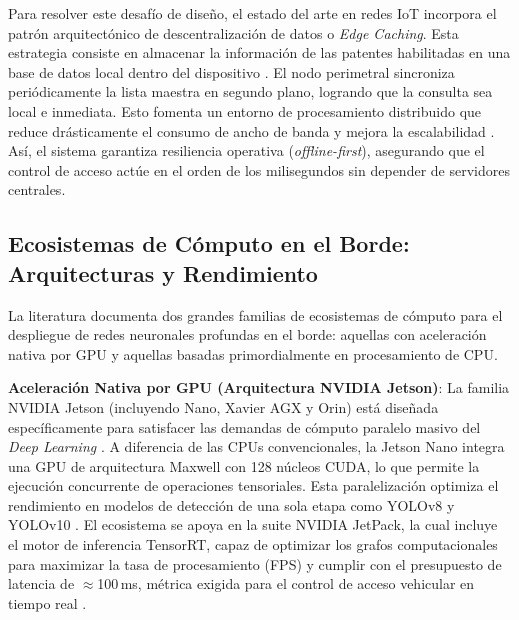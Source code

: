 Para resolver este desafío de diseño, el estado del arte en redes IoT incorpora el patrón arquitectónico de descentralización de datos o \textit{Edge Caching}. Esta estrategia consiste en almacenar la información de las patentes habilitadas en una base de datos local dentro del dispositivo \parencite{xuDeepLearningAlgorithms2026c}. El nodo perimetral sincroniza periódicamente la lista maestra en segundo plano, logrando que la consulta sea local e inmediata. Esto fomenta un entorno de procesamiento distribuido que reduce drásticamente el consumo de ancho de banda y mejora la escalabilidad \parencite{buleuDeepLearningBasedSystem2025a, kuyunsaDeepLearningEnhancedAutomatic2025}. Así, el sistema garantiza resiliencia operativa (\textit{offline-first}), asegurando que el control de acceso actúe en el orden de los milisegundos sin depender de servidores centrales.

\subsection{Ecosistemas de Cómputo en el Borde: Arquitecturas y Rendimiento}

La literatura documenta dos grandes familias de ecosistemas de cómputo para el despliegue 
de redes neuronales profundas en el borde: aquellas con aceleración nativa por GPU y 
aquellas basadas primordialmente en procesamiento de CPU.

\textbf{Aceleración Nativa por GPU (Arquitectura NVIDIA Jetson)}: 
La familia NVIDIA Jetson (incluyendo Nano, Xavier AGX y Orin) está diseñada específicamente 
para satisfacer las demandas de cómputo paralelo masivo del \textit{Deep Learning} 
\parencite{ammarMultiStageDeepLearningBasedVehicle2023, sonnaraEfficientRealtimeLicense2025}. 
A diferencia de las CPUs convencionales, la Jetson Nano integra una GPU de arquitectura Maxwell 
con 128 núcleos CUDA, lo que permite la ejecución concurrente de operaciones tensoriales. 
Esta paralelización optimiza el rendimiento en modelos de detección de una sola etapa como 
YOLOv8 y YOLOv10 \parencite{meesadAdvancedDeepLearning2025a, sonnaraEfficientRealtimeLicense2025}. 
El ecosistema se apoya en la suite NVIDIA JetPack, la cual incluye el motor de inferencia 
TensorRT, capaz de optimizar los grafos computacionales para maximizar la tasa de procesamiento 
(FPS) y cumplir con el presupuesto de latencia de $\approx$100\,ms, métrica exigida para 
el control de acceso vehicular en tiempo real \parencite{ammarMultiStageDeepLearningBasedVehicle2023, sonnaraEfficientRealtimeLicense2025}.

